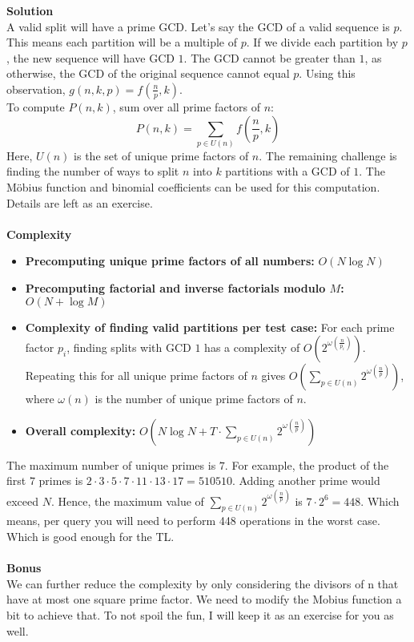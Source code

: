 {\textbf{Solution}} \\
A valid split will have a prime GCD. Let’s say the GCD of a valid sequence is $p$. 
This means each partition will be a multiple of $p$. If we divide each partition by $p$, 
the new sequence will have GCD $1$. The GCD cannot be greater than $1$, 
as otherwise, the GCD of the original sequence cannot equal $p$. 
Using this observation, $g(n,k,p) = f(\frac{n}{p},k)$. \\
To compute $P(n,k)$, sum over all prime factors of $n$:
$$P(n,k) = \sum_{p \in U(n)} f\left(\frac{n}{p},k\right)$$
Here, $U(n)$ is the set of unique prime factors of $n$. 
The remaining challenge is finding the number of ways to split 
$n$ into $k$ partitions with a GCD of $1$. The Möbius function 
and binomial coefficients can be used for this computation. 
Details are left as an exercise. \\
\\
\newpage
{\textbf{Complexity}}
\begin{itemize}
  \item \textbf{Precomputing unique prime factors of all numbers:} $O(N \log N)$
  \item \textbf{Precomputing factorial and inverse factorials modulo $M$:} $O(N + \log M)$
  \item \textbf{Complexity of finding valid partitions per test case:} 
  For each prime factor $p_i$, finding splits with GCD $1$ has a complexity of 
  $O(2^{\omega(\frac{n}{p_i})})$. Repeating this for all unique prime 
  factors of $n$ gives $O(\sum_{p \in U(n)} 2^{\omega(\frac{n}{p})})$, 
  where $\omega(n)$ is the number of unique prime factors of $n$.
  \item \textbf{Overall complexity:} $O(N \log N + T \cdot \sum_{p \in U(n)} 2^{\omega(\frac{n}{p})})$
\end{itemize}
The maximum number of unique primes is $7$. For example, the product of the first 
$7$ primes is $2 \cdot 3 \cdot 5 \cdot 7 \cdot 11 \cdot 13 \cdot 17 = 510510$. 
Adding another prime would exceed $N$. Hence, the maximum value of 
$\sum_{p \in U(n)} 2^{\omega(\frac{n}{p})}$ is $7 \cdot 2^6 = 448$. 
Which means, per query you will need to perform 448 operations in the worst case. 
Which is good enough for the TL. \\
\\
{\textbf{Bonus}} \\
We can further reduce the complexity by only considering the 
divisors of n that have at most one square prime factor. 
We need to modify the Mobius function a bit to achieve that. 
To not spoil the fun, I will keep it as an exercise for you as well.

